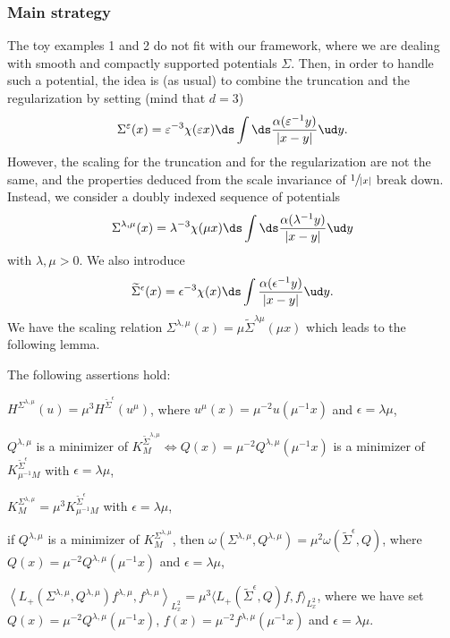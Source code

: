 \subsubsection*{Main strategy} The toy examples 1 and 2 do not fit with our framework, where we are dealing with smooth and compactly supported potentials $\Sigma$. Then, in order to handle such a potential, the idea is (as usual) to combine the truncation and the regularization by setting (mind that $d=3$)
\[
\Sigma^{\varepsilon}(x)=\varepsilon^{-3}\chi(\varepsilon x)\ds\int\ds\frac{\alpha(\varepsilon^{-1}y)}{|x-y|}\ud y.
\]
However, the scaling for the truncation and for the regularization are not the same,
and the properties deduced from the scale
invariance of $\sfrac{1}{|x|}$ break down.
Instead, we consider a doubly indexed sequence of potentials
\[
\Sigma^{\lambda,\mu}(x)=\lambda^{-3}\chi(\mu x)\ds\int\ds\frac{\alpha(\lambda^{-1}y)}{|x-y|}\ud y
\]
with $\lambda,\mu>0$.
We also introduce
\[
\widetilde{\Sigma}^{\epsilon}(x)=\epsilon^{-3}\chi(x)\ds\int \frac{\alpha(\epsilon^{-1}y)}{|x-y|}\ud y.
\]
We have the scaling relation $\Sigma^{\lambda,\mu}(x)=\mu\widetilde{\Sigma}^{\lambda\mu}(\mu x)$ which leads to the following lemma.
\begin{lemma}\label{lemma_scaling}
The following assertions hold:
\begin{enumeratei}
\item
$H^{\Sigma^{\lambda,\mu}}(u)=\mu^{3}H^{\widetilde{\Sigma}^{\epsilon}}(u^{\mu})$, where $u^{\mu}(x)=\mu^{-2}u(\mu^{-1}x)$ and $\epsilon=\lambda\mu$,
\item
$Q^{\lambda,\mu}$ is a minimizer of $K_{M}^{\widetilde{\Sigma}^{\lambda,\mu}}\Leftrightarrow Q(x)=\mu^{-2}Q^{\lambda,\mu}(\mu^{-1}x)$ is a minimizer of $K_{\mu^{-1}M}^{\widetilde{\Sigma}^{\epsilon}}$ with $\epsilon=\lambda\mu$,
\item
$K_{M}^{\Sigma^{\lambda,\mu}}=\mu^{3}K_{\mu^{-1}M}^{\widetilde{\Sigma}^{\epsilon}}$ with $\epsilon=\lambda\mu$,
\item
if $Q^{\lambda,\mu}$ is a minimizer of $K_{M}^{\Sigma^{\lambda,\mu}}$, then $\omega(\Sigma^{\lambda,\mu},Q^{\lambda,\mu})=\mu^{2}\omega(\widetilde{\Sigma}^{\epsilon},Q)$, where $Q(x)=\mu^{-2}Q^{\lambda,\mu}(\mu^{-1}x)$ and $\epsilon=\lambda\mu$,
\item
$\left\langle L_{+}(\Sigma^{\lambda,\mu},Q^{\lambda,\mu})f^{\lambda,\mu},f^{\lambda,\mu}\right\rangle_{L_{x}^{2}}=\mu^{3}\bigl\langle L_{+}(\widetilde{\Sigma}^{\epsilon},Q)f,f\bigr\rangle_{L_{x}^{2}}$, where we have set $Q(x)=\mu^{-2}Q^{\lambda,\mu}(\mu^{-1}x)$, $f(x)=\mu^{-2}f^{\lambda,\mu}(\mu^{-1}x)$ and $\epsilon=\lambda\mu$.
\end{enumeratei}
\end{lemma}

